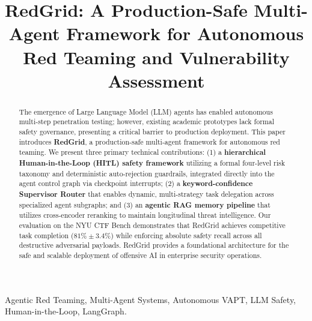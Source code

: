 \documentclass[conference,compsoc]{IEEEtran}
\begin{document}
\title{RedGrid: A Production-Safe Multi-Agent Framework for Autonomous Red Teaming and Vulnerability Assessment}

\author{
}

\maketitle

\begin{abstract}
The emergence of Large Language Model (LLM) agents has enabled autonomous multi-step penetration testing; however, existing academic prototypes lack formal safety governance, presenting a critical barrier to production deployment. This paper introduces \textbf{RedGrid}, a production-safe multi-agent framework for autonomous red teaming. We present three primary technical contributions: (1) a \textbf{hierarchical Human-in-the-Loop (HITL) safety framework} utilizing a formal four-level risk taxonomy and deterministic auto-rejection guardrails, integrated directly into the agent control graph via checkpoint interrupts; (2) a \textbf{keyword-confidence Supervisor Router} that enables dynamic, multi-strategy task delegation across specialized agent subgraphs; and (3) an \textbf{agentic RAG memory pipeline} that utilizes cross-encoder reranking to maintain longitudinal threat intelligence. Our evaluation on the NYU CTF Bench demonstrates that RedGrid achieves competitive task completion ($81\% \pm 3.4\%$) while enforcing absolute safety recall across all destructive adversarial payloads. RedGrid provides a foundational architecture for the safe and scalable deployment of offensive AI in enterprise security operations.
\end{abstract}

\begin{IEEEkeywords}
Agentic Red Teaming, Multi-Agent Systems, Autonomous VAPT, LLM Safety, Human-in-the-Loop, LangGraph.
\end{IEEEkeywords}
\end{document}
